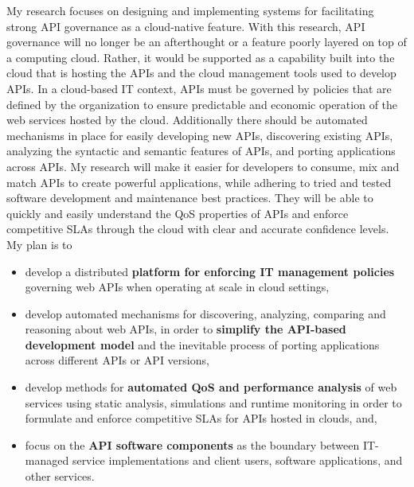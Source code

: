\documentclass[10pt]{article}
\begin{document}
My research focuses on designing and implementing systems for facilitating 
strong API governance as a cloud-native feature. With this research, API
governance will no longer be an afterthought or a feature poorly layered on
top of a computing cloud. Rather, it would be supported as a capability built into
the cloud that is hosting the APIs and the cloud management
tools used to develop APIs. 
In a cloud-based IT context, APIs must be governed by
policies that are defined by the organization to ensure predictable and
economic operation of the web services hosted by the cloud. Additionally
there should be automated mechanisms in place for easily developing new
APIs, discovering existing APIs, analyzing the syntactic and semantic features
of APIs, and porting applications across APIs. My research will make 
it easier for developers to consume, mix and match APIs to create powerful
applications, while adhering to tried and tested software development and 
maintenance best practices. They will be able to quickly and easily understand
the QoS properties of APIs and enforce competitive SLAs through the cloud
with clear and accurate confidence levels. My plan is to
\begin{itemize}
\item develop a distributed {\bf platform for enforcing IT 
management policies} governing
web APIs when operating at scale in cloud settings,
\item develop automated mechanisms for discovering, analyzing, comparing and reasoning
about web APIs, in order to {\bf simplify the API-based development model} and
the inevitable process of porting applications across different APIs or API versions,
\item develop methods for {\bf automated QoS and performance analysis} of web services
using static analysis, simulations and runtime monitoring in order
to formulate and enforce competitive SLAs for APIs hosted in clouds, and,
\item focus on the {\bf API software components} as the boundary between 
IT-managed
service implementations and client users, software applications, and other
services.
\end{itemize}
\end{document}

